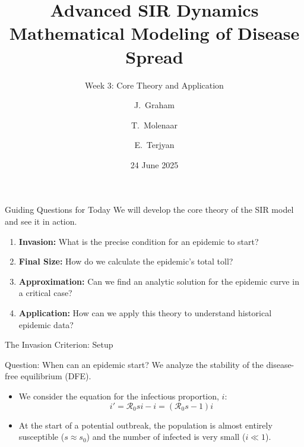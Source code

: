 \documentclass[14pt,aspectratio=169]{beamer}
\title[Modeling Disease Spread]{Advanced SIR Dynamics\\Mathematical Modeling of Disease Spread}
\subtitle{Week 3: Core Theory and Application}
\author{J.~Graham \and T.~Molenaar \and E.~Terjyan}
\institute[VU Amsterdam]{%
  Vrije University\\
  of Amsterdam \\
  Dynamical Systems Project}
\date{24 June 2025}
\newcommand{\RR}{\mathcal{R}_0}
\begin{document}
\begin{frame}[plain]
    \titlepage
\end{frame}

\begin{frame}{Guiding Questions for Today}
    We will develop the core theory of the SIR model and see it in action.
    \begin{enumerate}
        \item \textbf{Invasion:} What is the precise condition for an epidemic to start?
        \item \textbf{Final Size:} How do we calculate the epidemic's total toll?
        \item \textbf{Approximation:} Can we find an analytic solution for the epidemic curve in a critical case?
        \item \textbf{Application:} How can we apply this theory to understand historical epidemic data?
    \end{enumerate}
\end{frame}

\begin{frame}{The Invasion Criterion: Setup}
    \begin{block}{Question: When can an epidemic start?}
        We analyze the stability of the disease-free equilibrium (DFE).
    \end{block}
    \begin{itemize}
        \item We consider the equation for the infectious proportion, $i$:
        \[ i' = \RR s i - i = (\RR s - 1)i \]
        \item At the start of a potential outbreak, the population is almost entirely susceptible ($s \approx s_0$) and the number of infected is very small ($i \ll 1$).
    \end{itemize}
\end{frame}
\end{document}

